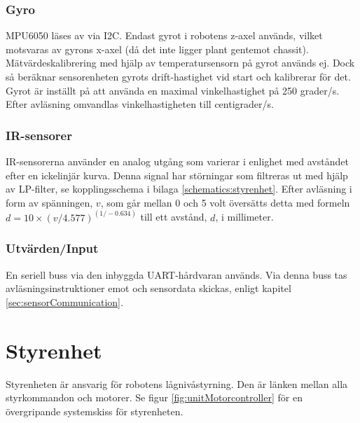 \documentclass[a4paper,11pt]{article}
\begin{document}
\clearpage

\subsubsection{Gyro}
MPU6050 läses av via I2C. Endast gyrot i robotens z-axel används, vilket motsvaras av gyrons x-axel (då det inte ligger plant gentemot chassit). Mätvärdeskalibrering med hjälp av temperatursensorn på gyrot används ej. Dock så beräknar sensorenheten gyrots drift-hastighet vid start och kalibrerar för det. Gyrot är inställt på att använda en maximal vinkelhastighet på 250 grader/s. Efter avläsning omvandlas vinkelhastigheten till centigrader/s.

\subsubsection{IR-sensorer}
IR-sensorerna använder en analog utgång som varierar i enlighet med avståndet efter en ickelinjär kurva. Denna signal har störningar som filtreras ut med hjälp av LP-filter, se kopplingsschema i bilaga \ref{schematics:styrenhet}. Efter avläsning i form av spänningen, $v$, som går mellan 0 och 5 volt översätts detta med formeln $d = 10 \times (v/4.577) ^{(1/-0.634)}$ till ett avstånd, $d$, i millimeter.

\subsubsection{Utvärden/Input}
En seriell buss via den inbyggda UART-hårdvaran används. Via denna buss tas avläsningsinstruktioner emot och sensordata skickas, enligt kapitel \ref{sec:sensorCommunication}.

\clearpage
\section{Styrenhet} \label{sec:system2}
Styrenheten är ansvarig för robotens lågnivåstyrning. Den är länken mellan alla styrkommandon och motorer. Se figur \ref{fig:unitMotorcontroller} för en övergripande systemskiss för styrenheten.
\end{document}
